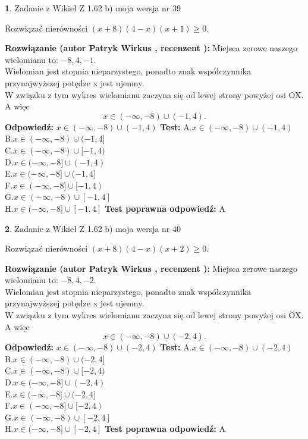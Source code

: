 \documentclass[12pt, a4paper]{article}
\theoremstyle{definition} %
\newtheorem{zad}{}
\newcommand{\zadStart}[1]{\begin{zad}#1\newline}
\newcommand{\zadStop}{\end{zad}}
\newcommand{\rozwStart}[2]{\noindent \textbf{Rozwiązanie (autor #1 , recenzent #2): }\newline}
\newcommand{\rozwStop}{\newline}
\newcommand{\odpStart}{\noindent \textbf{Odpowiedź:}\newline}
\newcommand{\odpStop}{\newline}
\newcommand{\testStart}{\noindent \textbf{Test:}\newline}
\newcommand{\testStop}{\newline}
\newcommand{\kluczStart}{\noindent \textbf{Test poprawna odpowiedź:}\newline}
\newcommand{\kluczStop}{\newline}
\begin{document}
\zadStart{Zadanie z Wikieł Z 1.62 b) moja wersja nr 39}

Rozwiązać nierówności $(x+8)(4-x)(x+1)\ge0$.
\zadStop
\rozwStart{Patryk Wirkus}{}
Miejsca zerowe naszego wielomianu to: $-8, 4, -1$.\\
Wielomian jest stopnia nieparzystego, ponadto znak współczynnika przy\linebreak najwyższej potędze x jest ujemny.\\ W związku z tym wykres wielomianu zaczyna się od lewej strony powyżej osi OX. A więc $$x \in (-\infty,-8) \cup (-1,4).$$
\rozwStop
\odpStart
$x \in (-\infty,-8) \cup (-1,4)$
\odpStop
\testStart
A.$x \in (-\infty,-8) \cup (-1,4)$\\
B.$x \in (-\infty,-8) \cup (-1,4]$\\
C.$x \in (-\infty,-8) \cup [-1,4)$\\
D.$x \in (-\infty,-8] \cup (-1,4)$\\
E.$x \in (-\infty,-8] \cup (-1,4]$\\
F.$x \in (-\infty,-8] \cup [-1,4)$\\
G.$x \in (-\infty,-8) \cup [-1,4]$\\
H.$x \in (-\infty,-8] \cup [-1,4]$
\testStop
\kluczStart
A
\kluczStop



\zadStart{Zadanie z Wikieł Z 1.62 b) moja wersja nr 40}

Rozwiązać nierówności $(x+8)(4-x)(x+2)\ge0$.
\zadStop
\rozwStart{Patryk Wirkus}{}
Miejsca zerowe naszego wielomianu to: $-8, 4, -2$.\\
Wielomian jest stopnia nieparzystego, ponadto znak współczynnika przy\linebreak najwyższej potędze x jest ujemny.\\ W związku z tym wykres wielomianu zaczyna się od lewej strony powyżej osi OX. A więc $$x \in (-\infty,-8) \cup (-2,4).$$
\rozwStop
\odpStart
$x \in (-\infty,-8) \cup (-2,4)$
\odpStop
\testStart
A.$x \in (-\infty,-8) \cup (-2,4)$\\
B.$x \in (-\infty,-8) \cup (-2,4]$\\
C.$x \in (-\infty,-8) \cup [-2,4)$\\
D.$x \in (-\infty,-8] \cup (-2,4)$\\
E.$x \in (-\infty,-8] \cup (-2,4]$\\
F.$x \in (-\infty,-8] \cup [-2,4)$\\
G.$x \in (-\infty,-8) \cup [-2,4]$\\
H.$x \in (-\infty,-8] \cup [-2,4]$
\testStop
\kluczStart
A
\kluczStop
\end{document}
